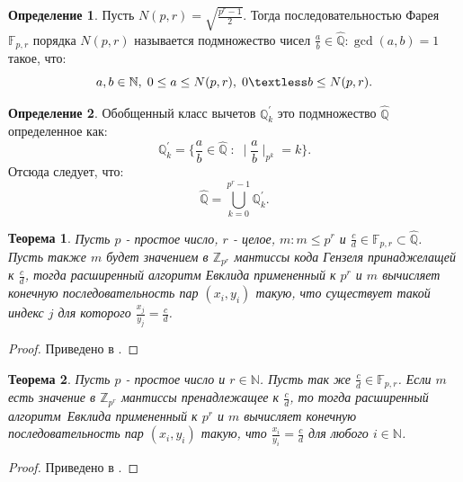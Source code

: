 \documentclass[master, och, diploma, times]{sty/SCWorks}
\theoremstyle{plain}
\newtheorem{thethm}{Теорема}[section]
\theoremstyle{definition}
\newtheorem{defn}{Определение}[section]
\numberwithin{equation}{section}
\begin{document}
\begin{defn}\label{def:farey}
Пусть $N(p, r)=\sqrt{\frac{p^r-1}{2}}$. Тогда последовательностью Фарея $\mathbb{F}_{p,r}$ порядка $N(p, r)$ называется подмножество чисел $\frac{a}{b} \in \hat{\mathbb{Q}}: \gcd{(a,b)}=1$ такое, что:
\begin{equation}
a, b \in \mathbb{N}, \; 0 \leq a \leq N(p, r), \; 0 \textless b \leq N(p, r).
\end{equation}
\end{defn}


\begin{defn}\label{def:qhat}
Обобщенный класс вычетов $\mathbb{Q}_k^{'}$ это подмножество $\hat{\mathbb{Q}}$ определенное как:
\begin{equation}
\mathbb{Q}_k^{'}=\bigg \{ \frac{a}{b} \in \hat{\mathbb{Q}} \; : \; \mid \frac{a}{b} \mid_{p^k}=k \bigg \}.
\end{equation}
Отсюда следует, что:
\begin{equation}
\hat{\mathbb{Q}} = \bigcup\limits_{k=0}^{p^r-1} \mathbb{Q}_k^{'}.
\end{equation}
\end{defn}


\begin{thethm}\label{th:backward_mapping}
Пусть $p$ - простое число, $r$ - целое, $m: m \leq p^r$ и $\frac{c}{d} \in \mathbb{F}_{p,r} \subset \hat{\mathbb{Q}}$. Пусть также $m$ будет значением в $\mathbb{Z}_{p^r}$ мантиссы кода Гензеля принаджелащей к $\frac{c}{d}$, тогда расширенный алгоритм Евклида примененный к $p^r$ и $m$ вычисляет конечную последовательность пар $(x_i, y_i)$ такую, что существует такой индекс $j$ для которого $\frac{x_j}{y_j}=\frac{c}{d}$.
\end{thethm}

\begin{proof} 
Приведено в \cite{bib:numbers:miola}.
\end{proof}

\begin{thethm}
Пусть $p$ - простое число и $r \in \mathbb{N}$. Пусть так же $\frac{c}{d} \in \mathbb{F}_{p,r}$. Если $m$ есть значение в $\mathbb{Z}_{p^r}$ мантиссы пренадлежащее к $\frac{c}{d}$, то тогда \mbox{расширенный} \mbox{алгоритм Евклида} примененный к $p^r$ и $m$ вычисляет конечную последовательность пар $(x_i, y_i)$ такую, что $\frac{x_i}{y_i}=\frac{c}{d}$ для любого $i \in \mathbb{N}$.
\end{thethm}

\begin{proof} 
Приведено в \cite{bib:numbers:miola}.
\end{proof}
\end{document}
